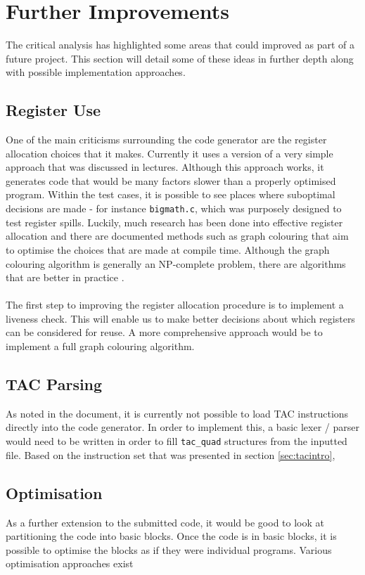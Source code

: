 \chapter{Further Improvements}

The critical analysis has highlighted some areas that could improved as part of a future project. This section will detail some of these ideas in further depth along with possible implementation approaches.

\section{Register Use}
One of the main criticisms surrounding the code generator are the register allocation choices that it makes. Currently it uses a version of a very simple approach that was discussed in lectures. Although this approach works, it generates code that would be many factors slower than a properly optimised program. Within the test cases, it is possible to see places where suboptimal decisions are made - for instance \verb!bigmath.c!, which was purposely designed to test register spills. Luckily, much research has been done into effective register allocation and there are documented methods such as graph colouring that aim to optimise the choices that are made at compile time. Although the graph colouring algorithm is generally an NP-complete problem, there are algorithms that are better in practice \cite{aho2007}.
\ \\ \ \\
The first step to improving the register allocation procedure is to implement a liveness check. This will enable us to make better decisions about which registers can be considered for reuse. A more comprehensive approach would be to implement a full graph colouring algorithm.

\section{TAC Parsing}
As noted in the document, it is currently not possible to load TAC instructions directly into the code generator. In order to implement this, a basic lexer / parser would need to be written in order to fill \verb!tac_quad! structures from the inputted file. Based on the instruction set that was presented in section \ref{sec:tacintro},

\section{Optimisation}
As a further extension to the submitted code, it would be good to look at partitioning the code into basic blocks. Once the code is in basic blocks, it is possible to optimise the blocks as if they were individual programs. Various optimisation approaches exist

